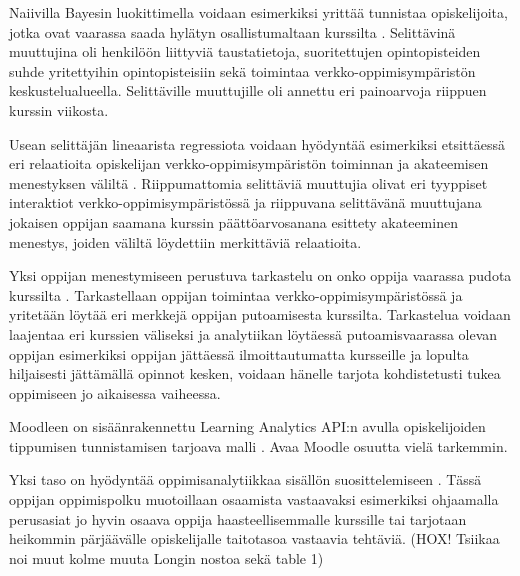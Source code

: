 Naiivilla Bayesin luokittimella voidaan esimerkiksi yrittää tunnistaa opiskelijoita, jotka ovat vaarassa saada hylätyn osallistumaltaan kurssilta \citep{barberCourseCorrectionUsing2012}. Selittävinä muuttujina oli henkilöön liittyviä taustatietoja, suoritettujen opintopisteiden suhde yritettyihin opintopisteisiin sekä toimintaa verkko-oppimisympäristön keskustelualueella. Selittäville muuttujille oli annettu eri painoarvoja riippuen kurssin viikosta.

Usean selittäjän lineaarista regressiota voidaan hyödyntää esimerkiksi etsittäessä eri relaatioita opiskelijan verkko-oppimisympäristön toiminnan ja akateemisen menestyksen väliltä \citep{agudo-peregrinaCanWePredict2014}. Riippumattomia selittäviä muuttujia olivat eri tyyppiset interaktiot verkko-oppimisympäristössä ja riippuvana selittävänä muuttujana jokaisen oppijan saamana kurssin päättöarvosanana esittety akateeminen menestys, joiden väliltä löydettiin merkittäviä relaatioita.

Yksi oppijan menestymiseen perustuva tarkastelu on onko oppija vaarassa pudota kurssilta \citep{oliveSupervisedLearningFramework2018, suhonenUsingMoodleData2019}. Tarkastellaan oppijan toimintaa verkko-oppimisympäristössä ja yritetään löytää eri merkkejä oppijan putoamisesta kurssilta. Tarkastelua voidaan laajentaa eri kurssien väliseksi \citep{kinnari-korpelaOppimisanalytiikallaTehokkaampaanOhjaukseen2020} ja analytiikan löytäessä putoamisvaarassa olevan oppijan esimerkiksi oppijan jättäessä ilmoittautumatta kursseille ja lopulta hiljaisesti jättämällä opinnot kesken, voidaan hänelle tarjota kohdistetusti tukea oppimiseen jo aikaisessa vaiheessa.

Moodleen on sisäänrakennettu Learning Analytics API:n avulla opiskelijoiden tippumisen tunnistamisen tarjoava malli \citep{oliveSupervisedLearningFramework2018,monllaoAnalyticsAPIMoodleDocs2021}. \color{red} Avaa Moodle osuutta vielä tarkemmin. \color{black}

Yksi taso on hyödyntää oppimisanalytiikkaa sisällön suosittelemiseen \citep{longPenetratingFogAnalytics2011,siemensLearningAnalyticsEmergence2013}. Tässä oppijan oppimispolku muotoillaan osaamista vastaavaksi esimerkiksi ohjaamalla perusasiat jo hyvin osaava oppija haasteellisemmalle kurssille tai tarjotaan heikommin pärjäävälle opiskelijalle taitotasoa vastaavia tehtäviä. \color{red}(HOX! Tsiikaa noi muut kolme muuta Longin nostoa sekä table 1)\color{black}


